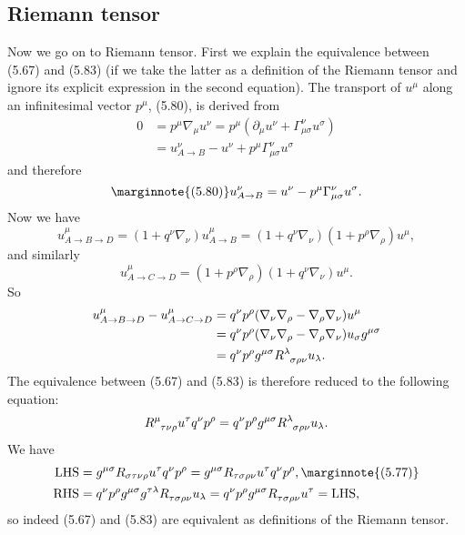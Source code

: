 \documentclass[hyperref, a4paper]{article}
\begin{document}
\subsection{Riemann tensor}

Now we go on to Riemann tensor.  First we explain the equivalence between (5.67) and (5.83) (if we take the 
latter as a definition of the Riemann tensor and ignore its explicit expression in the second equation).
The transport of $u^\mu$ along an infinitesimal vector $p^\mu$, (5.80), is derived from 
\[
    \begin{aligned}
        0 &= p^\mu \nabla_\mu u^\nu = p^\mu (\partial_\mu u^\nu + \Gamma^\nu_{\mu \sigma} u^\sigma) \\
        &= u^\nu_{A \to B} - u^\nu + p^\mu \Gamma^\nu_{\mu \sigma} u^\sigma
    \end{aligned}
\]
and therefore 
\begin{equation} \marginnote{(5.80)}
    u^\nu_{A \to B} = u^\nu - p^\mu \Gamma^\nu_{\mu \sigma} u^\sigma.
\end{equation}
Now we have 
\[
    u^\mu_{A \to B \to D} = (1 + q^\nu \nabla_\nu) u^\mu_{A \to B} = (1 + q^\nu \nabla_\nu) (1 + p^\rho \nabla_\rho) u^\mu,
\]
and similarly
\[
    u^\mu_{A \to C \to D} = (1 + p^\rho \nabla_\rho) (1 + q^\nu \nabla_\nu) u^\mu.
\]
So 
\[
    \begin{aligned}
        u^\mu_{A \to B \to D} - u^\mu_{A \to C \to D} &= q^\nu p^\rho (\nabla_\nu \nabla_\rho - \nabla_\rho \nabla_\nu) u^\mu \\
        &= q^\nu p^\rho (\nabla_\nu \nabla_\rho - \nabla_\rho \nabla_\nu) u_\sigma g^{\mu \sigma} \\ 
        &= q^\nu p^\rho g^{\mu \sigma} R\indices{^\lambda_{\sigma \rho \nu}} u_\lambda .
    \end{aligned}
\]
The equivalence between (5.67) and (5.83) is therefore reduced to the following equation:
\begin{equation}
    R\indices{^\mu_{\tau \nu \rho}} u^\tau q^\nu p^\rho = q^\nu p^\rho g^{\mu \sigma} R\indices{^\lambda_{\sigma \rho \nu}} u_\lambda.
\end{equation}
We have 
\[
    \begin{aligned}
        \text{LHS} &= g^{\mu \sigma} R_{\sigma \tau \nu \rho} u^\tau q^\nu p^\rho = g^{\mu \sigma} R_{\tau \sigma \rho \nu} u^\tau q^\nu p^\rho, \marginnote{(5.77)} \\
        \text{RHS} &= q^\nu p^\rho g^{\mu \sigma} g^{\tau \lambda} R\indices{_\tau_{\sigma \rho \nu}} u_\lambda = q^\nu p^\rho g^{\mu \sigma} R\indices{_\tau_{\sigma \rho \nu}} u^\tau = \text{LHS},
    \end{aligned}
\]
so indeed (5.67) and (5.83) are equivalent as definitions of the Riemann tensor.
\end{document}

